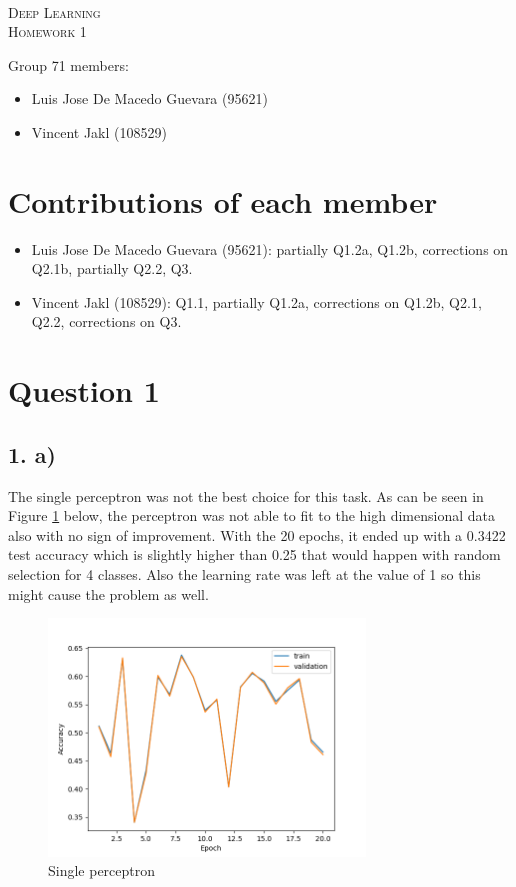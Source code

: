 \documentclass[11pt]{article}
\begin{document}
\begin{center}
  \mbox{}\\[2.0cm]
  \textsc{\Huge Deep Learning}\\[1.0cm]
  \textsc{\Large Homework 1}\\[0.5cm]
\end{center}
\begin{flushleft}
  Group 71 members: \\[0.5cm]
  \begin{itemize}
  \item Luis Jose De Macedo Guevara (95621)
  \item Vincent Jakl (108529)
  \end{itemize}
\end{flushleft}

\section{Contributions of each member}
\begin{itemize}
    \item Luis Jose De Macedo Guevara (95621): partially Q1.2a, Q1.2b, corrections on Q2.1b, partially Q2.2, Q3.
    \item Vincent Jakl (108529): Q1.1, partially Q1.2a, corrections on Q1.2b, Q2.1, Q2.2, corrections on Q3.
\end{itemize}
\pagebreak
\section{Question 1}
\subsection{1. a)}
The single perceptron was not the best choice for this task.
As can be seen in Figure \ref{fig:single_layer_perceptron} below, the perceptron was not able to fit to the high dimensional data also with no sign of improvement.
With the 20 epochs, it ended up with a 0.3422 test accuracy which is slightly higher than 0.25 that would happen with random selection for 4 classes.
Also the learning rate was left at the value of 1 so this might cause the problem as well.
\begin{figure}[h!]
  \centering
  \includegraphics[width=0.75\textwidth]{./plots/single_perceptron.png}
  \caption{Single perceptron}\label{fig:single_layer_perceptron}
\end{figure}
\end{document}

